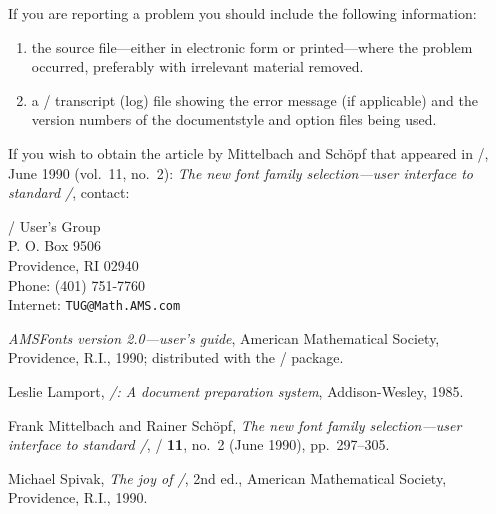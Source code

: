 \noindent If you are reporting a problem you should include
the following information:
\begin{enumerate}
\item the source file---either in electronic form or printed---where
  the problem occurred, preferably with irrelevant
  material removed.
\item a \latex/ transcript (log) file showing the error
 message (if applicable) and the version numbers of
 the documentstyle and option files being used.
\end{enumerate}

\medskip

If you wish to obtain the article by Mittelbach and Sch\"opf that
appeared in \tugboat/, June 1990 (vol.~11, no.~2): {\it The new font
family selection---user interface to standard \latex/\/}, contact:

\medskip
\begin{raggedright}

\leftskip=4.25pc
\tex/ User's Group\\
P. O. Box 9506\\
Providence, RI 02940\\[3pt]
Phone: (401) 751-7760\\
Internet: {\tt TUG@Math.AMS.com}\\
\end{raggedright}


\begin{thebibliography}{9}

 {\it AMSFonts version 2.0---user's guide},
American Mathematical Society, Providence, R.I., 1990; distributed
with the \amsfonts/ package.

 Leslie Lamport, {\it\latex/: A document preparation
system}, Addison-Wesley, 1985.

 Frank Mittelbach and Rainer Sch\"opf,
{\it The new font family
selection---user interface to standard \latex/},
\tugboat/ {\bf11}, no.~2 (June 1990), pp.~297--305.

 Michael Spivak, {\it The joy of \tex/}, 2nd ed.,
American Mathematical Society, Providence, R.I., 1990.

\end{thebibliography}

